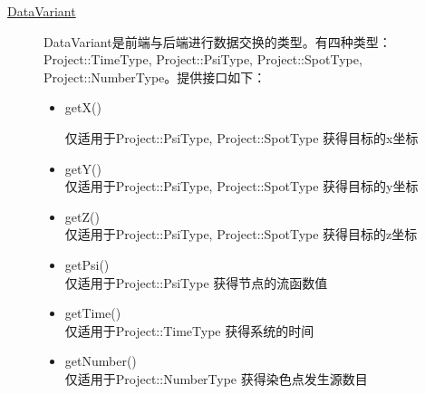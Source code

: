 \documentclass[12pt]{article}
\begin{document}
\begin{description}
\item[\underline{DataVariant}]
DataVariant是前端与后端进行数据交换的类型。有四种类型：Project::TimeType, Project::PsiType, Project::SpotType, Project::NumberType。提供接口如下：
\begin{itemize}
\item getX()

 仅适用于Project::PsiType, Project::SpotType
获得目标的x坐标

\item getY() \\仅适用于Project::PsiType, Project::SpotType
获得目标的y坐标

\item getZ()\\ 仅适用于Project::PsiType, Project::SpotType
获得目标的z坐标

\item getPsi()\\ 仅适用于Project::PsiType
获得节点的流函数值

\item getTime() \\仅适用于Project::TimeType
获得系统的时间

\item getNumber() \\仅适用于Project::NumberType
获得染色点发生源数目
\end{itemize}
\end{description}
\end{document}
